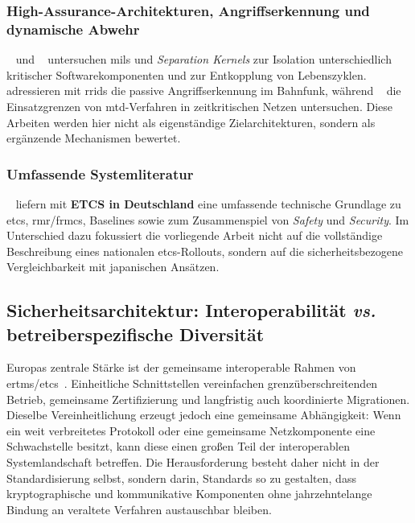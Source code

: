 \documentclass[runningheads]{res/llncs}
\begin{document}
\subsubsection{High-Assurance-Architekturen, Angriffserkennung und dynamische Abwehr}
~\cite{schulzIntegration2019} und ~\cite{tverdyshevCertMILS2019} untersuchen \gls{mils} und \textit{Separation Kernels} zur Isolation unterschiedlich kritischer Softwarekomponenten und zur Entkopplung von Lebenszyklen. ~\cite{melaragnoRail2016} adressieren mit \gls{rrids} die passive Angriffserkennung im Bahnfunk, während ~\cite {poschingerOpenMTD2020} die Einsatzgrenzen von \gls{mtd}-Verfahren in zeitkritischen Netzen untersuchen. Diese Arbeiten werden hier nicht als eigenständige Zielarchitekturen, sondern als ergänzende Mechanismen bewertet.

\subsubsection{Umfassende Systemliteratur}
~\cite{trinckaufETCS2024} liefern mit \textbf{ETCS in Deutschland} eine umfassende technische Grundlage zu \gls{etcs}, \gls{rmr}/\gls{frmcs}, Baselines sowie zum Zusammenspiel von \textit{Safety} und \textit{Security}. Im Unterschied dazu fokussiert die vorliegende Arbeit nicht auf die vollständige Beschreibung eines nationalen \gls{etcs}-Rollouts, sondern auf die sicherheitsbezogene Vergleichbarkeit mit japanischen Ansätzen.

\subsection{Sicherheitsarchitektur: Interoperabilität \textit{vs.} betreiberspezifische Diversität}
\label{sec:Sicherheitsarchitektur_Interoperabilität_vs_Betreiberspezifische_Diversität}
Europas zentrale Stärke ist der gemeinsame interoperable Rahmen von \gls{ertms}/\linebreak \gls{etcs}~\parencite[S. 38--40]{trinckaufETCS2024}. Einheitliche Schnittstellen vereinfachen grenzüberschreitenden Betrieb, gemeinsame Zertifizierung und langfristig auch koordinierte Migrationen. Dieselbe Vereinheitlichung erzeugt jedoch eine gemeinsame Abhängigkeit: Wenn ein weit verbreitetes Protokoll oder eine gemeinsame Netzkomponente eine Schwachstelle besitzt, kann diese einen großen Teil der interoperablen Systemlandschaft betreffen. Die Herausforderung besteht daher nicht in der Standardisierung selbst, sondern darin, Standards so zu gestalten, dass kryptographische und kommunikative Komponenten ohne jahrzehntelange Bindung an veraltete Verfahren austauschbar bleiben.
\end{document}
